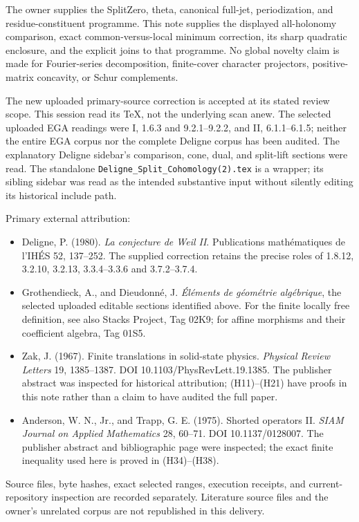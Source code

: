 \documentclass[
]{article}
\providecommand{\tightlist}{%
  \setlength{\itemsep}{0pt}\setlength{\parskip}{0pt}}
\begin{document}
The owner supplies the SplitZero, theta, canonical full-jet,
periodization, and residue-constituent programme. This note supplies the
displayed all-holonomy comparison, exact common-versus-local minimum
correction, its sharp quadratic enclosure, and the explicit joins to
that programme. No global novelty claim is made for Fourier-series
decomposition, finite-cover character projectors, positive-matrix
concavity, or Schur complements.

The new uploaded primary-source correction is accepted at its stated
review scope. This session read its TeX, not the underlying scan anew.
The selected uploaded EGA readings were I, 1.6.3 and 9.2.1--9.2.2, and
II, 6.1.1--6.1.5; neither the entire EGA corpus nor the complete Deligne
corpus has been audited. The explanatory Deligne sidebar's comparison,
cone, dual, and split-lift sections were read. The standalone
\texttt{Deligne\_Split\_Cohomology(2).tex} is a wrapper; its sibling
sidebar was read as the intended substantive input without silently
editing its historical include path.

Primary external attribution:

\begin{itemize}
\tightlist
\item
  Deligne, P. (1980). \emph{La conjecture de Weil II}. Publications
  mathématiques de l'IHÉS 52, 137--252. The supplied correction retains
  the precise roles of 1.8.12, 3.2.10, 3.2.13, 3.3.4--3.3.6 and
  3.7.2--3.7.4.
\item
  Grothendieck, A., and Dieudonné, J. \emph{Éléments de géométrie
  algébrique}, the selected uploaded editable sections identified above.
  For the finite locally free definition, see also Stacks Project, Tag
  02K9; for affine morphisms and their coefficient algebra, Tag 01S5.
\item
  Zak, J. (1967). Finite translations in solid-state physics.
  \emph{Physical Review Letters} 19, 1385--1387. DOI
  10.1103/PhysRevLett.19.1385. The publisher abstract was inspected for
  historical attribution; (H11)--(H21) have proofs in this note rather
  than a claim to have audited the full paper.
\item
  Anderson, W. N., Jr., and Trapp, G. E. (1975). Shorted operators II.
  \emph{SIAM Journal on Applied Mathematics} 28, 60--71. DOI
  10.1137/0128007. The publisher abstract and bibliographic page were
  inspected; the exact finite inequality used here is proved in
  (H34)--(H38).
\end{itemize}

Source files, byte hashes, exact selected ranges, execution receipts,
and current-repository inspection are recorded separately. Literature
source files and the owner's unrelated corpus are not republished in
this delivery.
\end{document}
